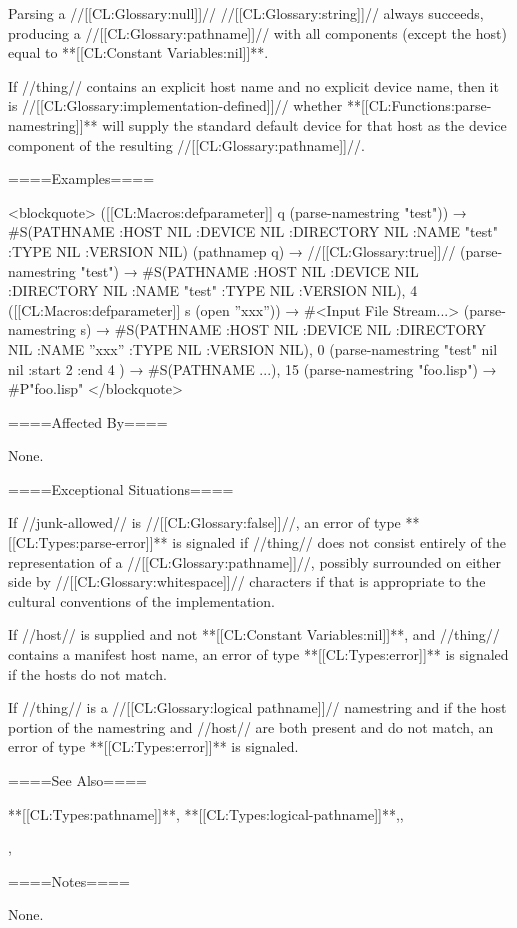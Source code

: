 Parsing a //[[CL:Glossary:null]]// //[[CL:Glossary:string]]// always succeeds, producing a //[[CL:Glossary:pathname]]// with all components (except the host) equal to **[[CL:Constant Variables:nil]]**.

If //thing// contains an explicit host name and no explicit device name, then it is //[[CL:Glossary:implementation-defined]]// whether **[[CL:Functions:parse-namestring]]** will supply the standard default device for that host as the device component of the resulting //[[CL:Glossary:pathname]]//.

====Examples====

<blockquote> ([[CL:Macros:defparameter]] q (parse-namestring "test")) → #S(PATHNAME :HOST NIL :DEVICE NIL :DIRECTORY NIL :NAME "test" :TYPE NIL :VERSION NIL) (pathnamep q) → //[[CL:Glossary:true]]// (parse-namestring "test") → #S(PATHNAME :HOST NIL :DEVICE NIL :DIRECTORY NIL :NAME "test" :TYPE NIL :VERSION NIL), 4 ([[CL:Macros:defparameter]] s (open ''xxx'')) → #<Input File Stream...> (parse-namestring s) → #S(PATHNAME :HOST NIL :DEVICE NIL :DIRECTORY NIL :NAME ''xxx'' :TYPE NIL :VERSION NIL), 0 (parse-namestring "test" nil nil :start 2 :end 4 ) → #S(PATHNAME ...), 15 (parse-namestring "foo.lisp") → #P"foo.lisp" </blockquote>

====Affected By====

None.

====Exceptional Situations====

If //junk-allowed// is //[[CL:Glossary:false]]//, an error of type **[[CL:Types:parse-error]]** is signaled if //thing// does not consist entirely of the representation of a //[[CL:Glossary:pathname]]//, possibly surrounded on either side by //[[CL:Glossary:whitespace]]// characters if that is appropriate to the cultural conventions of the implementation.

If //host// is supplied and not **[[CL:Constant Variables:nil]]**, and //thing// contains a manifest host name, an error of type **[[CL:Types:error]]** is signaled if the hosts do not match.

If //thing// is a //[[CL:Glossary:logical pathname]]// namestring and if the host portion of the namestring and //host// are both present and do not match, an error of type **[[CL:Types:error]]** is signaled.

====See Also====

**[[CL:Types:pathname]]**, **[[CL:Types:logical-pathname]]**,{\secref\FileSystemConcepts},

{\secref\UnspecificComponent},

{\secref\PathnamesAsFilenames}

====Notes====

None.

             
